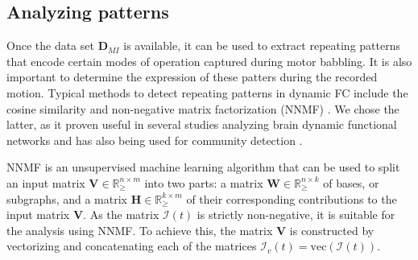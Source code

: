 \subsection{Analyzing patterns}
Once the data set $\bm{D}_{MI}$ is available, it can be used to extract repeating patterns that encode certain modes of operation captured during motor babbling. It is also important to determine the expression of these patters during the recorded motion. Typical methods to detect repeating patterns in dynamic FC include the cosine similarity \cite{Menon2019comparisonstaticdynamic} and  non-negative matrix factorization (NNMF) \cite{Fu2019Nonnegativematrixfactorization}. We chose the latter, as it proven useful in several studies analyzing brain dynamic functional networks and has also being used for community  detection\cite{Wang2011Communitydiscoveryusing,Luo2021Symmetricnonnegativematrix}
.

%

 NNMF is an unsupervised machine learning algorithm that can be used to split an input matrix $\bm{V} \in \mathbb{R}^{n\times m}_{\geq}$ into two parts: a matrix $\bm{W} \in \mathbb{R}^{n\times k}_{\geq}$ of bases, or subgraphs, and a matrix $\bm{H} \in \mathbb{R}^{k\times m}_{\geq}$ of their corresponding contributions to the input matrix $\bm{V}$. As the matrix $\bm{\mathcal{I}}(t)$ is strictly non-negative, it is suitable for the analysis using NNMF. To achieve this, the matrix $\bm{V}$ is constructed by vectorizing  and concatenating each of the matrices $\bm{\mathcal{I}}_v(t) = \text{vec}\left(\bm{\mathcal{I}}(t)\right)$. 
 
